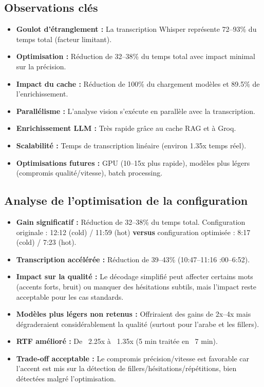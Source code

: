 ﻿\documentclass[12pt,a4paper]{article}
\begin{document}
\subsection{Observations clés}

\begin{itemize}
    \item \textbf{Goulot d'étranglement :} La transcription Whisper représente 72--93\% du temps total (facteur limitant).
    \item \textbf{Optimisation :} Réduction de 32--38\% du temps total avec impact minimal sur la précision.
    \item \textbf{Impact du cache :} Réduction de 100\% du chargement modèles et 89.5\% de l'enrichissement.
    \item \textbf{Parallélisme :} L'analyse vision s'exécute en parallèle avec la transcription.
    \item \textbf{Enrichissement LLM :} Très rapide grâce au cache RAG et à Groq.
    \item \textbf{Scalabilité :} Temps de transcription linéaire (environ 1.35x temps réel).
    \item \textbf{Optimisations futures :} GPU (10--15x plus rapide), modèles plus légers (compromis qualité/vitesse), batch processing.
\end{itemize}

\subsection{Analyse de l'optimisation de la configuration}

\begin{itemize}
    \item \textbf{Gain significatif :} Réduction de 32--38\% du temps total. Configuration originale : 12:12 (cold) / 11:59 (hot) \textbf{versus} configuration optimisée : 8:17 (cold) / 7:23 (hot).
    \item \textbf{Transcription accélérée :} Réduction de 39--43\% (10:47--11:16 :00--6:52).
    \item \textbf{Impact sur la qualité :} Le décodage simplifié peut affecter certains mots (accents forts, bruit) ou manquer des hésitations subtils, mais l'impact reste acceptable pour les cas standards.
    \item \textbf{Modèles plus légers non retenus :} Offriraient des gains de 2x--4x mais dégraderaient considérablement la qualité (surtout pour l'arabe et les fillers).
    \item \textbf{RTF amélioré :} De ~2.25x à ~1.35x (5 min traitée en ~7 min).
    \item \textbf{Trade-off acceptable :} Le compromis précision/vitesse est favorable car l'accent est mis sur la détection de fillers/hésitations/répétitions, bien détectées malgré l'optimisation.
\end{itemize}
\end{document}
